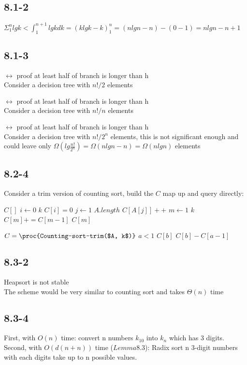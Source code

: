 \documentclass[]{article}
\begin{document}
\subsection{8.1-2}
$\Sigma_{1}^{n}lgk < \int_{1}^{n+1}lgkdk = (klgk - k)_{1}^{n} = (nlgn - n) - (0 - 1) = nlgn -n + 1 $
\subsection{8.1-3}

$ \leftrightarrow $ proof at least half of branch is longer than h
\\Consider a decision tree with $n!/2$ elements

$\leftrightarrow$ proof at least half of branch is longer than h
\\Consider a decision tree with $n!/n$ elements

$\leftrightarrow$ proof at least half of branch is longer than h
\\Consider a decision tree with $n!/2^n$ elements, this is not significant enough and could leave only $\Omega (lg\frac{n!}{2^n}) = \Omega(nlgn - n) = \Omega (nlgn)$ elements

\subsection{8.2-4}
Consider a trim version of counting sort, build the $C$ map up and query directly:
\begin{codebox}
	\li $C []$
	\li \For $i \gets 0$ \To $k$
	\li		\Do $C[i] = 0$
	\End
	\li \For $j \gets 1$ \To $A.length$
	\li		\Do $C[A[j]]++$
	\End
	\li \For $m \gets 1$ \To $k$
	\li		\Do $C[m] += C[m-1]$
	\End
	\li \Return $C[m]$
\end{codebox}

\begin{codebox}
	\li $C = \proc{Counting-sort-trim($A, k$)}$
	\li \If $a < 1$
	\li \Then \Return $C[b]$
	\li \Else \Return $C[b] - C[a-1]$
\end{codebox}

\subsection{8.3-2}
Heapsort is not stable\\
The scheme would be very similar to counting sort and takes $\Theta(n)$ time

\subsection{8.3-4}
First, with $O(n)$ time: convert n numbers $k_{10}$ into $k_{n}$ which has 3 digits.\\
Second, with $O(d(n+n))$ time ($Lemma8.3$): Radix sort n 3-digit numbers with each digits take up to n possible values.
\end{document}
